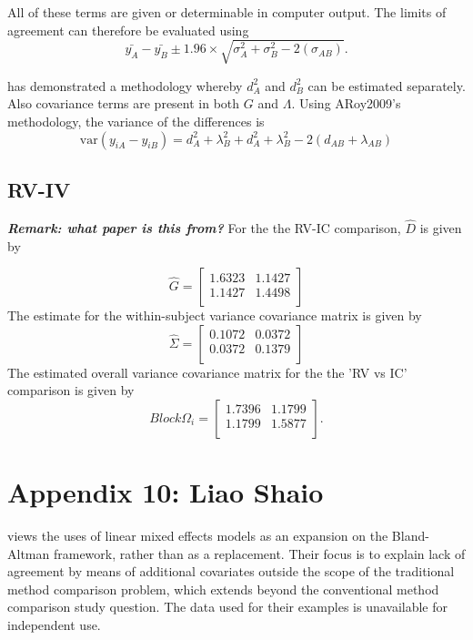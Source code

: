 \documentclass[12pt, a4paper]{report}
\theoremstyle{plain}
\theoremstyle{definition}
\theoremstyle{remark}
\begin{document}
All of these terms are given or determinable in computer output. The limits of agreement can therefore be evaluated using
\begin{equation}
\bar{y_{A}}-\bar{y_{B}} \pm 1.96 \times \sqrt{ \sigma^2_{A} + \sigma^2_{B}  - 2(\sigma_{AB})}.
\end{equation}



\citet{ARoy2009} has demonstrated a methodology whereby $d^2_{A}$ and $d^2_{B}$ can be estimated separately. Also covariance terms are present in both ${G}$ and ${\Lambda}$. Using ARoy2009's methodology, the variance of the differences is
\begin{equation}
\mbox{var} (y_{iA}-y_{iB})= d^2_{A} + \lambda^2_{B} + d^2_{A} + \lambda^2_{B} - 2(d_{AB} + \lambda_{AB})
\end{equation}
\subsection{RV-IV}
\textbf{\textit{Remark: what paper is this from?}}
For the the RV-IC comparison, $\hat{D}$ is given by
	
\begin{equation}
	\hat{G}= \left[ \begin{array}{cc}
	1.6323 & 1.1427  \\
	1.1427 & 1.4498 \\
	\end{array} \right]
	\end{equation}
The estimate for the within-subject variance covariance matrix is
	given by
	\begin{equation}
	\hat{\Sigma}= \left[ \begin{array}{cc}
	0.1072 & 0.0372  \\
	0.0372 & 0.1379  \\
	\end{array}\right]
	\end{equation}
The estimated overall variance covariance matrix for the the 'RV
	vs IC' comparison is given by
	\begin{equation}
	Block \Omega_{i}= \left[ \begin{array}{cc}
	1.7396 & 1.1799  \\
	1.1799 & 1.5877  \\
	\end{array} \right].
	\end{equation}

\section*{Appendix 10: Liao Shaio}
\citet{LaiShiao} views the uses of linear mixed effects models as an expansion on the Bland-Altman framework, rather than as a replacement.  Their focus is to explain lack of agreement by means of additional covariates outside the scope of the traditional method comparison problem, which extends beyond the conventional method comparison study question. The data used for their examples is unavailable for independent use. 
\end{document}
